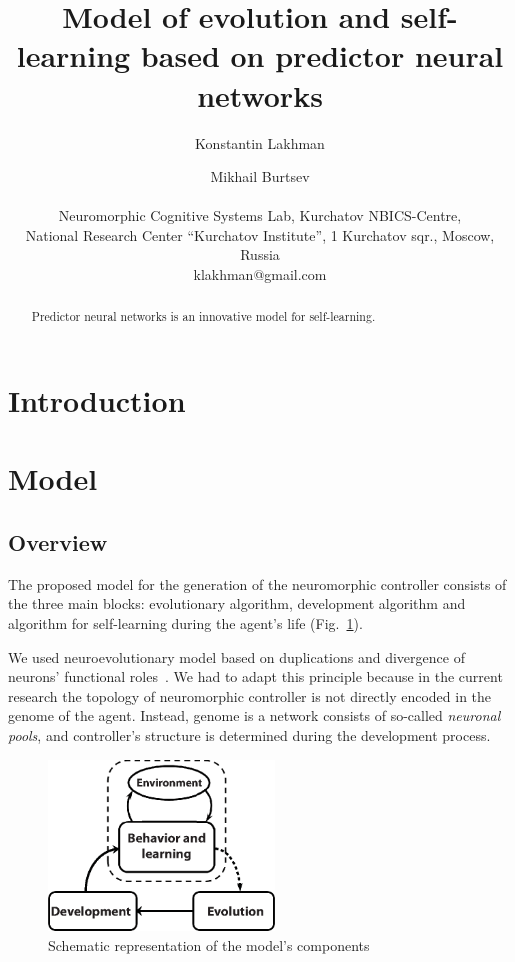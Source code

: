 \documentclass[letterpaper]{article}
\title{Model of evolution and self-learning based on predictor neural networks}
\author{Konstantin Lakhman \and Mikhail Burtsev \\
\mbox{}\\
Neuromorphic Cognitive Systems Lab, Kurchatov NBICS-Centre, \\
National Research Center ``Kurchatov Institute'', 1 Kurchatov sqr., Moscow, Russia \\
klakhman@gmail.com}
\begin{document}
\maketitle

\begin{abstract}
	Predictor neural networks is an innovative model for self-learning.
\end{abstract}

\section{Introduction}

\section{Model}

\subsection{Overview}

The proposed model for the generation of the neuromorphic controller consists of the three main blocks: evolutionary algorithm, development algorithm and algorithm for self-learning during the agent's life (Fig.~\ref{Model_Overview}).

We used neuroevolutionary model based on duplications and divergence of neurons' functional roles~\citep{LakhmanBurtsev2013}. We had to adapt this principle because in the current research the topology of neuromorphic controller is not directly encoded in the genome of the agent.  
Instead, genome is a network consists of so-called {\em neuronal pools}, and controller's structure is determined during the development process.

\begin{figure}[b!]
\begin{center}
\includegraphics[width=6cm]{Fig1_Model_Overview.eps}
\caption{Schematic representation of the model's components}
\label{Model_Overview}
\end{center}
\end{figure}
\end{document}
